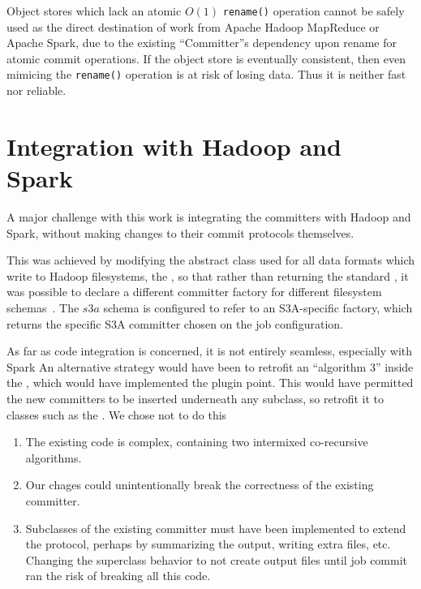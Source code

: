 \documentclass[9pt,technote]{IEEEtran}
\begin{document}
Object stores which lack an atomic $O(1)$ \texttt{rename()} operation cannot
be safely used as the direct destination of work from Apache Hadoop MapReduce
or Apache Spark, due to the existing ``Committer''s dependency upon rename for
atomic commit operations.
If the object store is eventually consistent, then even mimicing the \texttt{rename()}
operation is at risk of losing data.
Thus it is neither fast nor reliable.

\section{Integration with Hadoop and Spark}
\label{sec:integration}

A major challenge with this work is integrating the committers with Hadoop
and Spark, without making changes to their commit protocols themselves.

This was achieved by modifying the abstract class used for all data formats
which write to Hadoop filesystems, the , so that rather than
returning the standard , it was possible to declare
a different committer factory for different filesystem schemas\ \cite{MAPREDUCE-6823}.
The $s3a$ schema is configured to refer to an S3A-specific factory, which
returns the specific S3A committer chosen on the job configuration.


As far as code integration is concerned, it is not entirely seamless, especially
with Spark
An alternative strategy would have been to retrofit an ``algorithm 3'' inside
the , which would have implemented the plugin point.
This would have permitted the new committers to be inserted underneath any
subclass, so retrofit it to classes such as the .
We chose not to do this

\item \begin{enumerate}
  \item The existing code is complex, containing two intermixed co-recursive
  algorithms.
  \item Our chages could unintentionally break the correctness of the existing committer.
  \item Subclasses of the existing committer must have been implemented to extend
  the protocol, perhaps by summarizing the output, writing extra files, etc.
  Changing the superclass behavior to not create output files until job commit
  ran the risk of breaking all this code.
\end{enumerate}
\end{document}
